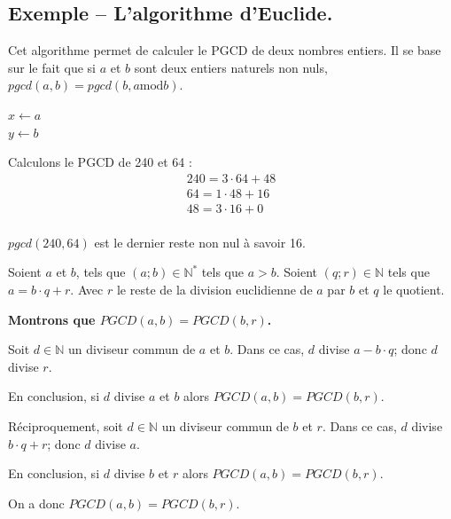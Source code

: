 \documentclass[11pt,oneside]{article}
\begin{document}
\subsection{Exemple -- L'algorithme d'Euclide.}


Cet algorithme permet de calculer le PGCD de deux nombres entiers. Il se base sur le fait que si $a$ et $b$ sont deux entiers naturels non nuls, $pgcd(a,b)=pgcd(b, a \text{mod} b)$. 


\begin{pseudo}
\begin{algorithm}[H]
$x\gets a$\\
$y\gets b$\\

\end{algorithm}
\end{pseudo}

\begin{exemple}
Calculons le PGCD de 240 et 64 :
\begin{eqnarray*}
240 = 3\cdot 64 + 48 \\
64 = 1\cdot 48 + 16 \\
48 = 3\cdot 16 + 0 \\
\end{eqnarray*}

$pgcd(240,64)$ est le dernier reste non nul à savoir 16.

\end{exemple}

\begin{demo}
Soient $a$ et $b$, tels que $(a;b)\in \mathbb{N}^*$ tels que $a > b$. Soient $(q;r)\in \mathbb{N}$ tels que $a=b\cdot q+r$. Avec $r$ le reste de la division euclidienne de $a$ par $b$ et $q$ le quotient.

\textbf{Montrons que $PGCD(a,b)=PGCD(b,r)$.}

Soit $d\in\mathbb{N}$ un diviseur commun de $a$ et $b$. Dans ce cas, $d$ divise $a-b\cdot q$; donc $d$ divise $r$.

En conclusion, si $d$ divise $a$ et $b$ alors $PGCD(a,b)=PGCD(b,r)$.

Réciproquement, soit $d\in\mathbb{N}$ un diviseur commun de $b$ et $r$. Dans ce cas, $d$ divise $b\cdot q+r$; donc $d$ divise $a$.

En conclusion, si $d$ divise $b$ et $r$ alors $PGCD(a,b)=PGCD(b,r)$.

On a donc $PGCD(a,b)=PGCD(b,r)$.

\end{demo}
\end{document}
